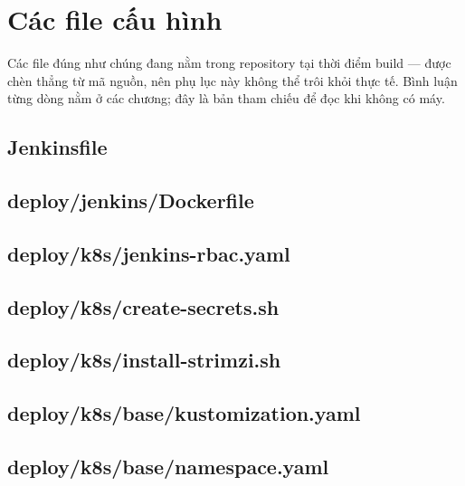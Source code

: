 \chapter{Các file cấu hình}
\label{app:listings}

Các file đúng như chúng đang nằm trong repository tại thời điểm build
--- được chèn thẳng từ mã nguồn, nên phụ lục này không thể trôi khỏi
thực tế. Bình luận từng dòng nằm ở các chương; đây là bản tham chiếu để
đọc khi không có máy.

\lstset{basicstyle=\ttfamily\scriptsize}

\section*{Jenkinsfile}


\section*{deploy/jenkins/Dockerfile}


\section*{deploy/k8s/jenkins-rbac.yaml}


\section*{deploy/k8s/create-secrets.sh}


\section*{deploy/k8s/install-strimzi.sh}


\section*{deploy/k8s/base/kustomization.yaml}


\section*{deploy/k8s/base/namespace.yaml}



